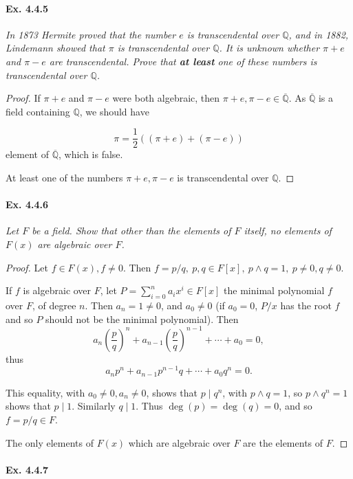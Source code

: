 \documentclass[11pt,a4paper]{article}
\newcommand{\Q}{\mathbb{Q}}
\begin{document}
\paragraph{Ex. 4.4.5}

{\it In 1873 Hermite proved that the number $e$ is transcendental over $\Q$, and in 1882, Lindemann showed that $\pi$ is transcendental over $\Q$. It is unknown whether $\pi+e$ and $\pi-e$ are transcendental. Prove that {\bf at least} one of these numbers is transcendental over $\Q$.
}

\begin{proof}
If $\pi+e$ and $\pi -e$ were both algebraic, then  $\pi+e,\pi -e \in \overline{\Q}$.  As $\overline{\Q}$ is a field containing $\Q$, we should have

$$\pi = \frac{1}{2}\left( (\pi+e) + (\pi-e)\right) $$
element of $\overline{\Q}$, which is false.

At least one of the numbers $\pi+e,\pi-e$ is transcendental over $\Q$.

\end{proof}

\paragraph{Ex. 4.4.6}

{\it Let $F$ be a field. Show that other than the elements of $F$ itself, no elements of $F(x)$ are algebraic over $F$.
}

\begin{proof}
Let $f \in F(x), f\neq 0$. Then $f =p/q,\  p,q \in F[x], \ p \wedge q = 1,\  p\neq 0, q\neq 0$.

If $f$ is algebraic over $F$, let $P  = \sum_{i=0}^n a_i x^i \in F[x]$ the minimal polynomial $f$ over $F$, of degree $n$. Then $a_n = 1 \neq 0$, and $a_0 \neq 0$ (if $a_0 = 0$,  $P/x$ has the root $f$ and so $P$ should not be the minimal polynomial). Then 
$$a_{n}\left ( \frac{p}{q}\right )^n+a_{n-1}\left ( \frac{p}{q}\right )^{n-1}+\cdots+a_0 = 0,$$
thus   $$a_n p^n + a_{n-1} p^{n-1}q+\cdots+a_0 q^n = 0.$$

This equality, with $a_0 \neq 0, a_n \neq 0$, shows that $p \mid q^n$, with $p\wedge q= 1$, so $p \wedge q^n=1$ shows that $p \mid 1$. Similarly $q\mid 1$. Thus $\deg(p) =\deg(q) =0$, and so $f=p/q \in F$.

The only elements of $F(x)$ which are algebraic over $F$ are the elements of $F$.
\end{proof}

\paragraph{Ex. 4.4.7} 
\end{document}
